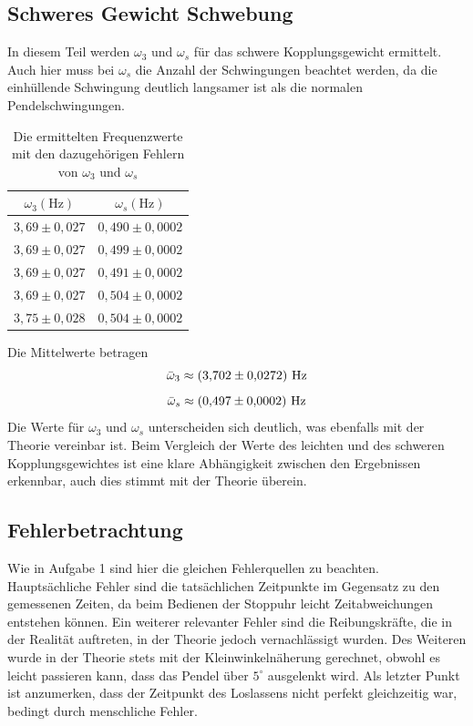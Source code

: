 \subsection*{Schweres Gewicht Schwebung}
In diesem Teil werden $\omega_3$ und $\omega_s$ für das schwere Kopplungsgewicht ermittelt. Auch hier muss bei $\omega_s$ die Anzahl der Schwingungen beachtet werden, da die einhüllende Schwingung deutlich langsamer ist als die normalen Pendelschwingungen.
\begin{table}[H]
    \centering
    \begin{tabular}{c|c}
        $\omega_3 \left(\text{Hz}\right)$ & $\omega_s \left(\text{Hz}\right)$ \\
        \hline
        $3{,}69 \pm 0{,}027$ & $0{,}490 \pm 0{,}0002$ \\
        $3{,}69 \pm 0{,}027$ & $0{,}499 \pm 0{,}0002$ \\
        $3{,}69 \pm 0{,}027$ & $0{,}491 \pm 0{,}0002$ \\
        $3{,}69 \pm 0{,}027$ & $0{,}504 \pm 0{,}0002$ \\
        $3{,}75 \pm 0{,}028$ & $0{,}504 \pm 0{,}0002$ \\
    \end{tabular}
    \caption{Die ermittelten Frequenzwerte mit den dazugehörigen Fehlern von $\omega_3$ und $\omega_s$}
\end{table}
Die Mittelwerte betragen
\begin{equation*}
    \centering
    \bar{\omega}_3 \approx \left(3{,}702 \pm 0{,}0272 \right)\,\text{Hz}
\end{equation*}
\begin{equation*}
    \centering
    \bar{\omega}_s \approx \left(0{,}497 \pm 0{,}0002 \right)\,\text{Hz}
\end{equation*}
Die Werte für $\omega_3$ und $\omega_s$ unterscheiden sich deutlich, was ebenfalls mit der Theorie vereinbar ist. Beim Vergleich der Werte des leichten und des schweren Kopplungsgewichtes ist eine klare Abhängigkeit zwischen den Ergebnissen erkennbar, auch dies stimmt mit der Theorie überein.

\subsection*{Fehlerbetrachtung}
Wie in Aufgabe 1 sind hier die gleichen Fehlerquellen zu beachten. Hauptsächliche Fehler sind die tatsächlichen Zeitpunkte im Gegensatz zu den gemessenen Zeiten, da beim Bedienen der Stoppuhr leicht Zeitabweichungen entstehen können. Ein weiterer relevanter Fehler sind die Reibungskräfte, die in der Realität auftreten, in der Theorie jedoch vernachlässigt wurden. Des Weiteren wurde in der Theorie stets mit der Kleinwinkelnäherung gerechnet, obwohl es leicht passieren kann, dass das Pendel über $5^\circ$ ausgelenkt wird. Als letzter Punkt ist anzumerken, dass der Zeitpunkt des Loslassens nicht perfekt gleichzeitig war, bedingt durch menschliche Fehler.

